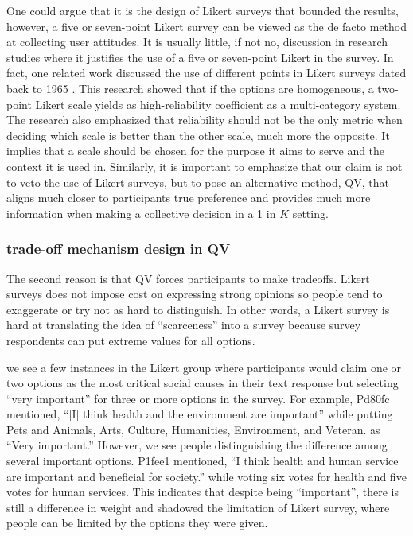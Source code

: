 One could argue that it is the design of Likert surveys that bounded the results, however,
a five or seven-point Likert survey can be viewed as the de facto method at collecting user attitudes.
It is usually little, if not no, discussion in research studies where it justifies the use of a five or seven-point Likert in the survey.
In fact, one related work discussed the use of different points in Likert surveys dated back to 1965 \cite{komorita1965number}. 
This research showed that if the options are homogeneous, a two-point Likert scale yields as high-reliability coefficient as a multi-category system.
The research also emphasized that reliability should not be the only metric when deciding which scale is better than the other scale, much more the opposite.
It implies that a scale should be chosen for the purpose it aims to serve and the context it is used in.
Similarly, it is important to emphasize that our claim is not to veto the use of Likert surveys, but to pose an alternative method, QV, that aligns much closer to participants true preference and provides much more information when making a collective decision in a 1 in $K$ setting.

\subsubsection{trade-off mechanism design in QV}
The second reason is that
QV forces participants to make tradeoffs.
Likert surveys does not impose cost 
on expressing strong opinions 
so people tend to exaggerate 
or try not as hard to distinguish. 
In other words,
a Likert survey is hard 
at translating the idea of ``scarceness'' 
into a survey 
because survey respondents can put extreme values 
for all options. 

we see a few instances in the Likert group 
where participants would claim one or two options 
as the most critical social causes in their text response 
but selecting ``very important'' for 
three or more options in the survey.
For example, Pd80fc mentioned, ``[I] think health and the environment are important'' while putting Pets and Animals, Arts, Culture, Humanities, Environment, and Veteran. as ``Very important.''
However, we see people distinguishing the difference
among several important options.
P1fee1 mentioned, ``I think health and human service are important and beneficial for society.'' while voting six votes for health and five votes for human services. This indicates that despite being ``important'', there is still a difference in weight and shadowed the limitation of Likert survey, where people can be limited by the options they were given.


